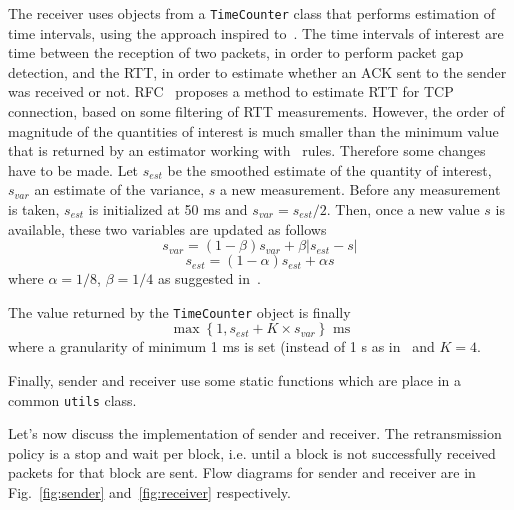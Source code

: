 The receiver uses objects from a \texttt{TimeCounter} class that performs estimation of time intervals, using the approach inspired to~\cite{rfc6298}. The time intervals of interest are time between the reception of two packets, in order to perform packet gap detection, and the RTT, in order to estimate whether an ACK sent to the sender was received or not. RFC~\cite{rfc6298} proposes a method to estimate RTT for TCP connection, based on some filtering of RTT measurements. However, the order of magnitude of the quantities of interest is much smaller than the minimum value that is returned by an estimator working with~\cite{rfc6298} rules. Therefore some changes have to be made. Let $s_{est}$ be the smoothed estimate of the quantity of interest, $s_{var}$ an estimate of the variance, $s$ a new measurement. Before any measurement is taken, $s_{est}$ is initialized at 50 ms and $s_{var} = s_{est}/2$. Then, once a new value $s$ is available, these two variables are updated as follows
\begin{equation}
	s_{var} = (1-\beta) s_{var}  + \beta |s_{est} - s|
\end{equation}
\begin{equation}
	s_{est} = (1 - \alpha) s_{est} + \alpha s
\end{equation}
where $\alpha = 1/8$, $\beta = 1/4$ as suggested in~\cite{rfc6298}.

The value returned by the \texttt{TimeCounter} object is finally
\begin{equation}
	\max\left\{1, s_{est} + K\times s_{var}  \right\} \mbox{ ms}
\end{equation}
where a granularity of minimum 1 ms is set (instead of 1 s as in~\cite{rfc6298} and $K = 4$. 

Finally, sender and receiver use some static functions which are place in a common \texttt{utils} class. 

Let's now discuss the implementation of sender and receiver. The retransmission policy is a stop and wait per block, i.e. until a block is not successfully received packets for that block are sent. Flow diagrams for sender and receiver are in Fig.~\ref{fig:sender} and~\ref{fig:receiver} respectively. 

